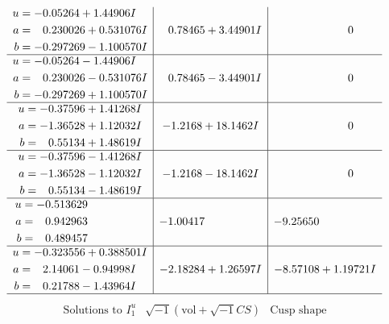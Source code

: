 \documentclass[1p]{elsarticle_modified}
\theoremstyle{definition}
\newcommand{\I}{\sqrt{-1}}
\begin{document}
$$\begin{array}{c|c|c}
\begin{aligned}
u &= -0.05264 + 1.44906 I \\
a &= \phantom{-}0.230026 + 0.531076 I \\
b &= -0.297269 - 1.100570 I\end{aligned}
 & \phantom{-}0.78465 + 3.44901 I & \phantom{-0.000000 } 0 \\ \hline\begin{aligned}
u &= -0.05264 - 1.44906 I \\
a &= \phantom{-}0.230026 - 0.531076 I \\
b &= -0.297269 + 1.100570 I\end{aligned}
 & \phantom{-}0.78465 - 3.44901 I & \phantom{-0.000000 } 0 \\ \hline\begin{aligned}
u &= -0.37596 + 1.41268 I \\
a &= -1.36528 + 1.12032 I \\
b &= \phantom{-}0.55134 + 1.48619 I\end{aligned}
 & -1.2168 + 18.1462 I & \phantom{-0.000000 } 0 \\ \hline\begin{aligned}
u &= -0.37596 - 1.41268 I \\
a &= -1.36528 - 1.12032 I \\
b &= \phantom{-}0.55134 - 1.48619 I\end{aligned}
 & -1.2168 - 18.1462 I & \phantom{-0.000000 } 0 \\ \hline\begin{aligned}
u &= -0.513629\phantom{ +0.000000I} \\
a &= \phantom{-}0.942963\phantom{ +0.000000I} \\
b &= \phantom{-}0.489457\phantom{ +0.000000I}\end{aligned}
 & -1.00417\phantom{ +0.000000I} & -9.25650\phantom{ +0.000000I} \\ \hline\begin{aligned}
u &= -0.323556 + 0.388501 I \\
a &= \phantom{-}2.14061 - 0.94998 I \\
b &= \phantom{-}0.21788 - 1.43964 I\end{aligned}
 & -2.18284 + 1.26597 I & -8.57108 + 1.19721 I\\
 \hline 
 \end{array}$$\newpage$$\begin{array}{c|c|c}  
\text{Solutions to }I^u_{1}& \I (\text{vol} + \sqrt{-1}CS) & \text{Cusp shape}\\
 \hline 
\begin{aligned}

\end{aligned}
\end{array}$$
\end{document}
